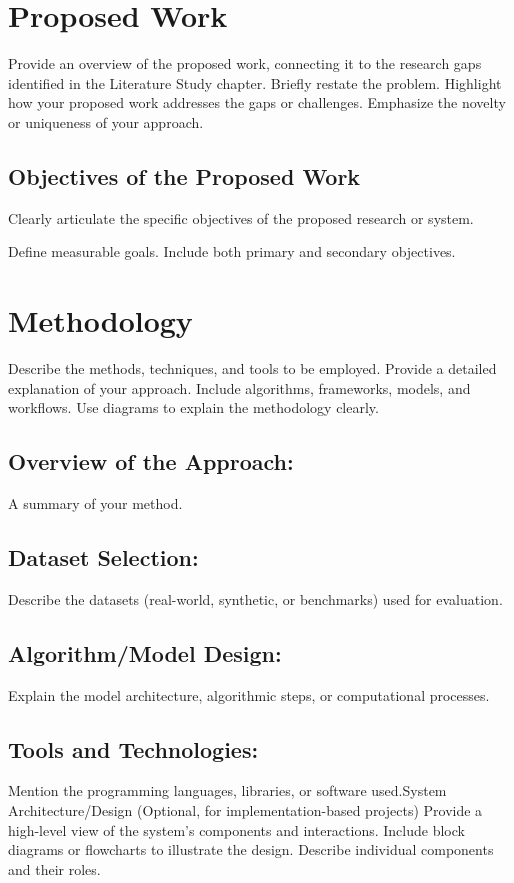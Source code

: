 \label{chap.3}
\section{Proposed Work}
Provide an overview of the proposed work, connecting it to the research gaps identified in the Literature Study chapter.
Briefly restate the problem.
Highlight how your proposed work addresses the gaps or challenges.
Emphasize the novelty or uniqueness of your approach.

\subsection{ Objectives of the Proposed Work}
 Clearly articulate the specific objectives of the proposed research or system.

Define measurable goals.
Include both primary and secondary objectives.

\section{ Methodology}
 Describe the methods, techniques, and tools to be employed.
Provide a detailed explanation of your approach.
Include algorithms, frameworks, models, and workflows.
Use diagrams to explain the methodology clearly.

\subsection{Overview of the Approach:} A summary of your method.
\subsection{Dataset Selection:} Describe the datasets (real-world, synthetic, or benchmarks) used for evaluation.
\subsection{Algorithm/Model Design:} Explain the model architecture, algorithmic steps, or computational processes.
\subsection{Tools and Technologies:} Mention the programming languages, libraries, or software used.System Architecture/Design (Optional, for implementation-based projects)
Provide a high-level view of the system's components and interactions.
Include block diagrams or flowcharts to illustrate the design.
Describe individual components and their roles.

